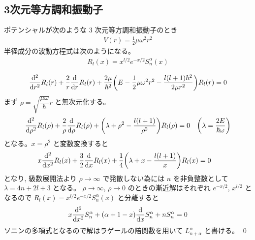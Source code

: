 \documentclass[uplatex,dvipdfmx,a4paper,11pt]{jlreq}
\makeatletter
\theoremstyle{definition}
\renewenvironment{proof}[1][\proofname]{\par
  \normalfont
  \topsep6\p@\@plus6\p@ \trivlist
  \item[\hskip\labelsep{\bfseries #1}\@addpunct{\bfseries}]\ignorespaces\quad\par
}{%
  \qed\endtrivlist\@endpefalse
}
\renewcommand\proofname{証明}
\makeatother
\begin{document}
\subsection{3次元等方調和振動子}
\begin{proposition}
  ポテンシャルが次のような 3 次元等方調和振動子のとき
  \begin{align}
    V(r) = \frac{1}{2}\mu\omega^2r^2
  \end{align}
  半径成分の波動方程式は次のようになる。
  \begin{align}
    R_l(x) = x^{l/2}e^{-x/2}S_n^\alpha(x)
  \end{align}
\end{proposition}
\begin{proof}
  \begin{align}
    \dv[2]{r}R_l(r) + \frac{2}{r}\dv{r}R_l(r) + \frac{2\mu}{\hbar^2}\qty(E - \frac{1}{2}\mu\omega^2r^2 - \frac{l(l+1)\hbar^2}{2\mu r^2})R_l(r) = 0
  \end{align}
  まず $\rho = \sqrt{\dfrac{\mu\omega}{\hbar}}r$ と無次元化する。
  \begin{align}
    \dv[2]{\rho}R_l(\rho) + \frac{2}{\rho}\dv{\rho}R_l(\rho) + \qty(\lambda + \rho^2 - \frac{l(l+1)}{\rho^2})R_l(\rho) & = 0 & \qty(\lambda = \frac{2E}{\hbar\omega})
  \end{align}
  となる。$x = \rho^2$ と変数変換すると
  \begin{align}
     & x\dv[2]{x}R_l(x) + \frac{3}{2}\dv{x}R_l(x) + \frac{1}{4}\qty(\lambda + x - \frac{l(l+1)}{x})R_l(x) = 0
  \end{align}
  となり, 級数展開法より $\rho\to\infty$ で発散しない為には $n$ を非負整数として $\lambda = 4n + 2l + 3$ となる。
  $\rho\to\infty$, $\rho\to 0$ のときの漸近解はそれぞれ $e^{-x/2}$, $x^{l/2}$ となるので $R_l(x) = x^{l/2}e^{-x/2}S_n^\alpha(x)$ と分離すると
  \begin{align}
    x\dv[2]{x}S_n^\alpha + (\alpha + 1 - x)\dv{x}S_n^\alpha + nS_n^\alpha = 0
  \end{align}
  ソニンの多項式となるので解はラゲールの陪関数を用いて $L_{n + \alpha}^\alpha$ と書ける。
\end{proof}
\end{document}
